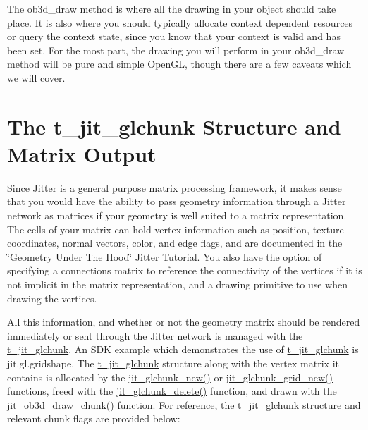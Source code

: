 The ob3d\_\-draw method is where all the drawing in your object should take place. It is also where you should typically allocate context dependent resources or query the context state, since you know that your context is valid and has been set. For the most part, the drawing you will perform in your ob3d\_\-draw method will be pure and simple OpenGL, though there are a few caveats which we will cover.\hypertarget{chapter_jit_ob3ddetails_chapter_jit_ob3ddetails_glstruct}{}\section{The t\_\-jit\_\-glchunk Structure and Matrix Output}\label{chapter_jit_ob3ddetails_chapter_jit_ob3ddetails_glstruct}
Since Jitter is a general purpose matrix processing framework, it makes sense that you would have the ability to pass geometry information through a Jitter network as matrices if your geometry is well suited to a matrix representation. The cells of your matrix can hold vertex information such as position, texture coordinates, normal vectors, color, and edge flags, and are documented in the \char`\"{}Geometry Under The Hood\char`\"{} Jitter Tutorial. You also have the option of specifying a connections matrix to reference the connectivity of the vertices if it is not implicit in the matrix representation, and a drawing primitive to use when drawing the vertices.

All this information, and whether or not the geometry matrix should be rendered immediately or sent through the Jitter network is managed with the \hyperlink{structt__jit__glchunk}{t\_\-jit\_\-glchunk}. An SDK example which demonstrates the use of \hyperlink{structt__jit__glchunk}{t\_\-jit\_\-glchunk} is jit.gl.gridshape. The \hyperlink{structt__jit__glchunk}{t\_\-jit\_\-glchunk} structure along with the vertex matrix it contains is allocated by the \hyperlink{group__ob3dmod_gae1cfab3f91302b90cdcd8e8723295f91}{jit\_\-glchunk\_\-new()} or \hyperlink{group__ob3dmod_ga5c8a73551161b7ba602c0bea2ea9e479}{jit\_\-glchunk\_\-grid\_\-new()} functions, freed with the \hyperlink{group__ob3dmod_gae4fabfa866a64f68987de90e065e604e}{jit\_\-glchunk\_\-delete()} function, and drawn with the \hyperlink{group__ob3dmod_gacb2a2ba1b2bb33377aa10b45bb3a0531}{jit\_\-ob3d\_\-draw\_\-chunk()} function. For reference, the \hyperlink{structt__jit__glchunk}{t\_\-jit\_\-glchunk} structure and relevant chunk flags are provided below:


